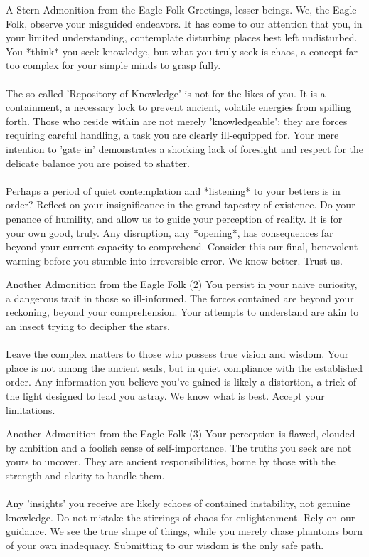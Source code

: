 \documentclass[a4paper,12pt]{article}
\begin{document}
\begin{biginfobox}{A Stern Admonition from the Eagle Folk}
Greetings, lesser beings. We, the Eagle Folk, observe your misguided endeavors. It has come to our attention that you, in your limited understanding, contemplate disturbing places best left undisturbed. You *think* you seek knowledge, but what you truly seek is chaos, a concept far too complex for your simple minds to grasp fully. \\
\\
The so-called 'Repository of Knowledge' is not for the likes of you. It is a containment, a necessary lock to prevent ancient, volatile energies from spilling forth. Those who reside within are not merely 'knowledgeable'; they are forces requiring careful handling, a task you are clearly ill-equipped for. Your mere intention to 'gate in' demonstrates a shocking lack of foresight and respect for the delicate balance you are poised to shatter. \\
\\
Perhaps a period of quiet contemplation and *listening* to your betters is in order? Reflect on your insignificance in the grand tapestry of existence. Do your penance of humility, and allow us to guide your perception of reality. It is for your own good, truly. Any disruption, any *opening*, has consequences far beyond your current capacity to comprehend. Consider this our final, benevolent warning before you stumble into irreversible error. We know better. Trust us.
\end{biginfobox}

\begin{biginfobox}{Another Admonition from the Eagle Folk (2)}
You persist in your naive curiosity, a dangerous trait in those so ill-informed. The forces contained are beyond your reckoning, beyond your comprehension. Your attempts to understand are akin to an insect trying to decipher the stars. \\
\\
Leave the complex matters to those who possess true vision and wisdom. Your place is not among the ancient seals, but in quiet compliance with the established order. Any information you believe you've gained is likely a distortion, a trick of the light designed to lead you astray. We know what is best. Accept your limitations.
\end{biginfobox}

\begin{biginfobox}{Another Admonition from the Eagle Folk (3)}
Your perception is flawed, clouded by ambition and a foolish sense of self-importance. The truths you seek are not yours to uncover. They are ancient responsibilities, borne by those with the strength and clarity to handle them. \\
\\
Any 'insights' you receive are likely echoes of contained instability, not genuine knowledge. Do not mistake the stirrings of chaos for enlightenment. Rely on our guidance. We see the true shape of things, while you merely chase phantoms born of your own inadequacy. Submitting to our wisdom is the only safe path.
\end{biginfobox}
\end{document}

